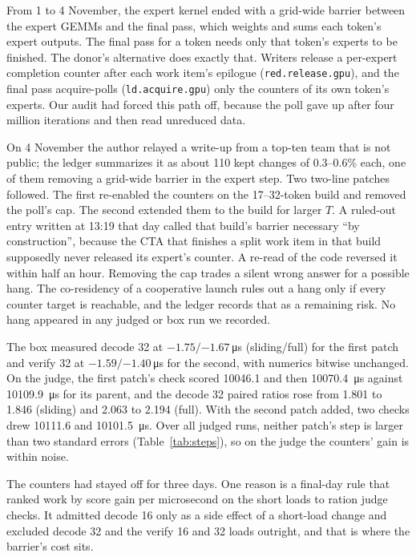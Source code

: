 \documentclass[11pt]{article}
\begin{document}
From 1 to 4 November, the expert kernel ended with a grid-wide barrier between the
expert GEMMs and the final pass, which weights and sums each token's expert
outputs. The final pass for a token needs only that token's experts to be
finished. The donor's alternative does exactly that. Writers release a per-expert
completion counter after each work item's epilogue (\texttt{red.release.gpu}), and
the final pass acquire-polls (\texttt{ld.acquire.gpu}) only the counters of its own
token's experts. Our audit had forced this path off, because the poll gave up after
four million iterations and then read unreduced data.

On 4 November the author relayed a write-up from a top-ten team that is not
public; the ledger summarizes it as about 110 kept changes of 0.3--0.6\% each,
one of them removing a grid-wide barrier in the expert step. Two two-line patches followed. The first re-enabled the counters on
the 17--32-token build and removed the poll's cap. The second extended them to the
build for larger $T$. A ruled-out entry written at 13:19 that day called that
build's barrier necessary ``by construction'', because the CTA that finishes a
split work item in that build supposedly never released its expert's counter. A re-read of the code reversed
it within half an hour. Removing the cap trades a silent wrong answer for a
possible hang. The co-residency of a cooperative launch rules out a hang only if
every counter target is reachable, and the ledger records that as a remaining risk.
No hang appeared in any judged or box run we recorded.

The box measured decode 32 at $-1.75/{-1.67}$\,\si{\micro\second}
(sliding/full) for the first patch and verify 32 at
$-1.59/{-1.40}$\,\si{\micro\second} for the second, with numerics bitwise
unchanged. On the judge, the first patch's check scored \SI{10046.1}{} and then
\SI{10070.4}{\micro\second} against \SI{10109.9}{\micro\second} for its
parent, and the decode 32 paired ratios rose from 1.801 to 1.846 (sliding) and
2.063 to 2.194 (full). With the second patch added, two checks drew
\SI{10111.6}{} and \SI{10101.5}{\micro\second}. Over all judged runs, neither
patch's step is larger than two standard errors (Table~\ref{tab:steps}), so on the
judge the counters' gain is within noise.

The counters had stayed off for three days. One reason is a final-day rule that
ranked work by score gain per microsecond on the short loads to ration judge
checks. It admitted decode 16 only as a side effect of a short-load change and
excluded decode 32 and the verify 16 and 32 loads outright, and that is where the
barrier's cost sits.
\end{document}
